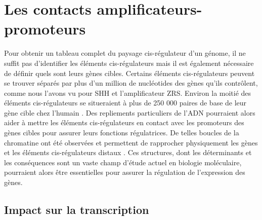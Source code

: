 \section{Les contacts \glspl{amplificateur}-promoteurs}
\label{sec:contact}

Pour obtenir un tableau complet du paysage \gls{cis}-régulateur d'un génome, il ne suffit pas d'identifier les éléments \gls{cis}-régulateurs mais il est également nécessaire de définir quels sont leurs gènes cibles. Certains éléments \gls{cis}-régulateurs peuvent se trouver séparés par plus d'un million de nucléotides des gènes qu’ils contrôlent, comme nous l’avons vu pour \acrshort{SHH} et l’\gls{amplificateur} \acrshort{ZRS}. Environ la moitié des éléments \gls{cis}-régulateurs se situeraient à plus de 250 000 paires de base de leur gène cible chez l’humain \citep{montavon_regulatory_2011}. Des repliements particuliers de l’ADN pourraient alors aider à mettre les éléments \gls{cis}-régulateurs en contact avec les promoteurs des gènes cibles pour assurer leurs fonctions régulatrices. De telles boucles de la chromatine ont été observées et permettent de rapprocher physiquement les gènes et les éléments \gls{cis}-régulateurs distaux \citep{tolhuis_looping_2002}. Ces structures, dont les déterminants et les conséquences sont un vaste champ d'étude actuel en biologie moléculaire, pourraient alors être essentielles pour assurer la régulation de l’expression des gènes.

\subsection{Impact sur la transcription}
\label{subsec:impact-transcription}

